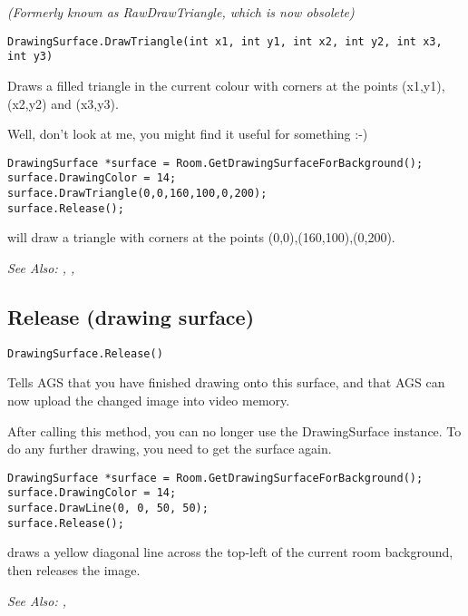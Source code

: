\it{(Formerly known as RawDrawTriangle, which is now obsolete)}

\begin{verbatim}
DrawingSurface.DrawTriangle(int x1, int y1, int x2, int y2, int x3, int y3)
\end{verbatim}
Draws a filled triangle in the current colour with corners at the points
(x1,y1), (x2,y2) and (x3,y3).

Well, don't look at me, you might find it useful for something :-)

\begin{verbatim}
DrawingSurface *surface = Room.GetDrawingSurfaceForBackground();
surface.DrawingColor = 14;
surface.DrawTriangle(0,0,160,100,0,200);
surface.Release();
\end{verbatim}
will draw a triangle with corners at the points (0,0),(160,100),(0,200).

\it{See Also:} ,
 ,


\subsection{Release (drawing surface)}\label{DrawingSurface.Release}%

\begin{verbatim}
DrawingSurface.Release()
\end{verbatim}
Tells AGS that you have finished drawing onto this surface, and that AGS can now upload
the changed image into video memory.

After calling this method, you can no longer use the DrawingSurface instance. To do
any further drawing, you need to get the surface again.

\begin{verbatim}
DrawingSurface *surface = Room.GetDrawingSurfaceForBackground();
surface.DrawingColor = 14;
surface.DrawLine(0, 0, 50, 50);
surface.Release();
\end{verbatim}
draws a yellow diagonal line across the top-left of the current room background,
then releases the image.

\it{See Also:} ,


